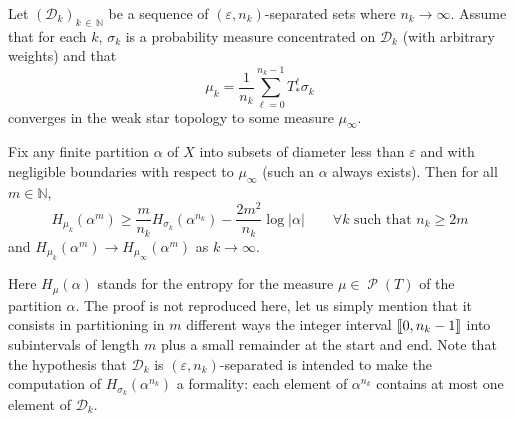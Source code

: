 \documentclass[AHL, Unicode, longabstracts,published]{cedram}
\theoremstyle{plain}
\theoremstyle{plain}
\newcommand\eps{\varepsilon}
\newcommand\Prob{{\operatorname{\mathscr{P}}}}
\newcommand*\al{\alpha}
\newcommand*\8{\infty}
\newcommand\NN{\mathbb{N}}
\newcommand{\cD}{\mathcal{D}}
\newcommand{\llbracket}{\mathopen{[\mkern -2.7mu[}}
\newcommand{\rrbracket}{\mathclose{]\mkern -2.7mu]}}
\let\oldforall\forall
\renewcommand*{\forall}{\mathrel{\oldforall}}
\begin{document}
\begin{lemm}[Misiurewicz]\label{lem-Misiurewicz}
Let $(\cD_k)_{k\,\in\,\NN}$ be a sequence of $(\eps,n_k)$-separated sets where $n_k\to\infty$. Assume that for each $k$, $\sigma_k$ is a probability measure concentrated on $\cD_k$ (with arbitrary weights) and that
\[
\mu_k = \frac{1}{n_k}\sum_{\ell=0}^{n_k-1} T_*^\ell \sigma_k
\]
converges in the weak star topology to some measure $\mu_\infty$.

Fix any finite partition $\alpha$ of $X$ into subsets of diameter less than $\eps$ and with negligible boundaries with respect to $\mu_\infty$ {(such an $\alpha$ always exists). Then} for all $m\in\NN$,
\[
H_{\mu_k}(\alpha^m) \ge \frac{m}{n_k} H_{\sigma_k}(\alpha^{n_k})-\frac{2m^2}{n_k}\log\lvert\alpha\rvert \qquad \forall k \text{ such that }n_k\ge 2m
\]
and $H_{\mu_k}(\alpha^m)\to H_{\mu_\infty}(\alpha^m)$ as $k\to\infty$.
\end{lemm}

Here $H_{\mu}(\al)$ stands for the entropy for the measure $\mu\in \Prob(T)$ of the partition $\al$. The proof is not reproduced here, let us simply mention that it consists in partitioning in $m$ different ways the integer interval $\llbracket 0, n_k-1\rrbracket$ into subintervals of length $m$ plus a small remainder at the start and end. Note that the hypothesis that $ \cD_k$ is $(\eps,n_k)$-separated is intended to make the computation of $H_{\sigma_k}(\alpha^{ n_k})$ a formality: each element of $\alpha^{ n_k}$ contains at most one element of $ \cD_k$.
\end{document}
